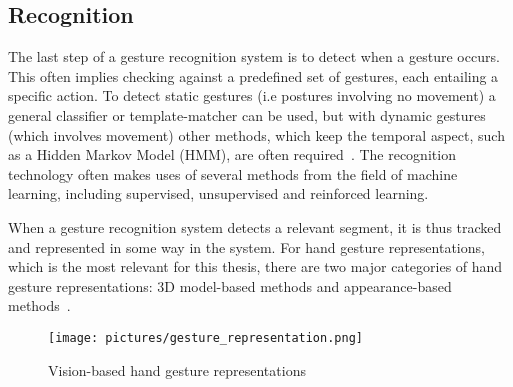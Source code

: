 \subsection{Recognition}
The last step of a gesture recognition system is to detect when a gesture occurs. 
This often implies checking against a predefined set of gestures, each entailing a specific action. 
To detect static gestures (i.e postures involving no movement) a general classifier or template-matcher can be used, 
but with dynamic gestures (which involves movement) other methods, which keep the temporal aspect, such as a Hidden Markov Model (HMM), are often required~\citep{Benton1995}. 
The recognition technology often makes uses of several methods from the field of machine learning, including supervised, unsupervised and reinforced learning.

When a gesture recognition system detects a relevant segment, it is thus tracked and represented in some way in the system. For hand gesture representations, 
which is the most relevant for this thesis, there are two major categories of hand gesture representations: 3D model-based methods and appearance-based methods~\citep{Rautaray2015}.

\begin{figure}%
	\texttt{[image: pictures/gesture\_representation.png]}
	\caption[Vision-based hand gesture representations]{Vision-based hand gesture representations~\citep{Bourke2007} }
	\label{fig:gesture_representations}
\end{figure}